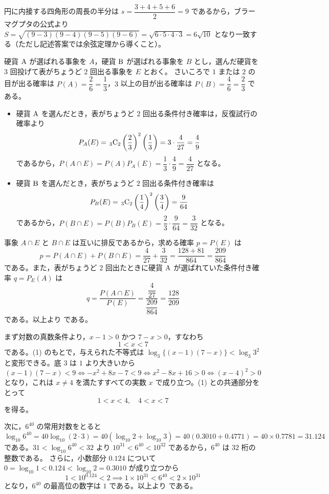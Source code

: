 \begin{betsu}[別解：ブラーマグプタの公式による面積の検算]
円に内接する四角形の周長の半分は $s=\dfrac{3+4+5+6}{2}=9$ であるから，ブラーマグプタの公式より $S=\sqrt{(9-3)(9-4)(9-5)(9-6)}=\sqrt{6\cdot 5\cdot 4\cdot 3}=6\sqrt{10}$ となり一致する（ただし記述答案では余弦定理から導くこと）。
\end{betsu}

硬貨 $\mathrm{A}$ が選ばれる事象を $A$，硬貨 $\mathrm{B}$ が選ばれる事象を $B$ とし，選んだ硬貨を $3$ 回投げて表がちょうど $2$ 回出る事象を $E$ とおく。
さいころで $1$ または $2$ の目が出る確率は $P(A)=\dfrac{2}{6}=\dfrac{1}{3}$，$3$ 以上の目が出る確率は $P(B)=\dfrac{4}{6}=\dfrac{2}{3}$ である。
\begin{itemize}[leftmargin=1.6em,itemsep=2pt]
  \item 硬貨 $\mathrm{A}$ を選んだとき，表がちょうど $2$ 回出る条件付き確率は，反復試行の確率より
  \[
    P_{A}(E)=\mskip2.5mu{}_{3}\mathrm{C}_{2}\left(\frac{2}{3}\right)^{2}\left(\frac{1}{3}\right)=3\cdot\frac{4}{27}=\frac{4}{9}
  \]
  であるから，$P(A\cap E)=P(A)P_{A}(E)=\dfrac{1}{3}\cdot\dfrac{4}{9}=\dfrac{4}{27}$ となる。
  \item 硬貨 $\mathrm{B}$ を選んだとき，表がちょうど $2$ 回出る条件付き確率は
  \[
    P_{B}(E)=\mskip2.5mu{}_{3}\mathrm{C}_{2}\left(\frac{1}{4}\right)^{2}\left(\frac{3}{4}\right)=\frac{9}{64}
  \]
  であるから，$P(B\cap E)=P(B)P_{B}(E)=\dfrac{2}{3}\cdot\dfrac{9}{64}=\dfrac{3}{32}$ となる。
\end{itemize}
事象 $A\cap E$ と $B\cap E$ は互いに排反であるから，求める確率 $p=P(E)$ は
\[
  p=P(A\cap E)+P(B\cap E)=\frac{4}{27}+\frac{3}{32}=\frac{128+81}{864}=\frac{209}{864}
\]
である。また，表がちょうど $2$ 回出たときに硬貨 $\mathrm{A}$ が選ばれていた条件付き確率 $q=P_{E}(A)$ は
\[
  q=\frac{P(A\cap E)}{P(E)}=\frac{\dfrac{4}{27}}{\dfrac{209}{864}}=\frac{128}{209}
\]
である。以上より
である。

まず対数の真数条件より，$x-1>0$ かつ $7-x>0$，すなわち
\[
  1<x<7 \tag{1}
\]
である。(1) のもとで，与えられた不等式は $\log_{3}\{(x-1)(7-x)\}<\log_{3}3^{2}$ と変形できる。底 $3$ は $1$ より大きいから
\[
  (x-1)(7-x)<9 \iff -x^{2}+8x-7<9 \iff x^{2}-8x+16>0 \iff (x-4)^{2}>0
\]
となり，これは $x\ne 4$ を満たすすべての実数 $x$ で成り立つ。(1) との共通部分をとって
\[
  1<x<4,\quad 4<x<7
\]
を得る。

次に，$6^{40}$ の常用対数をとると
\[
  \log_{10}6^{40}=40\log_{10}(2\cdot 3)=40(\log_{10}2+\log_{10}3)=40(0.3010+0.4771)=40\times 0.7781=31.124
\]
である。$31<\log_{10}6^{40}<32$ より $10^{31}<6^{40}<10^{32}$ であるから，$6^{40}$ は $32$ 桁の整数である。
さらに，小数部分 $0.124$ について $0=\log_{10}1<0.124<\log_{10}2=0.3010$ が成り立つから
\[
  1<10^{0.124}<2 \implies 1\times 10^{31}<6^{40}<2\times 10^{31}
\]
となり，$6^{40}$ の最高位の数字は $1$ である。以上より
である。

